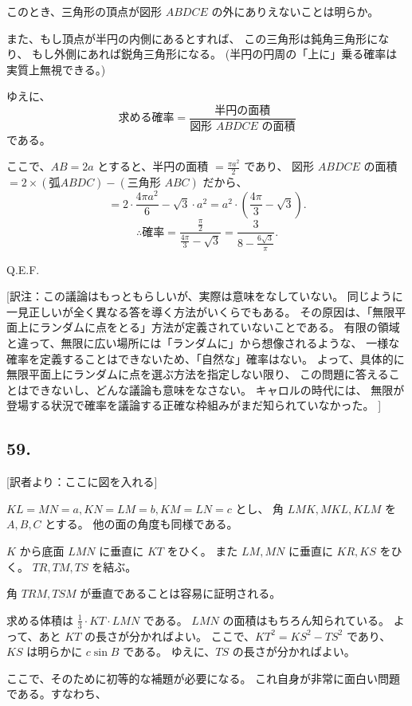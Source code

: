 このとき、三角形の頂点が図形 $ABDCE$ の外にありえないことは明らか。

また、もし頂点が半円の内側にあるとすれば、
この三角形は鈍角三角形になり、
もし外側にあれば鋭角三角形になる。
(半円の円周の「上に」乗る確率は実質上無視できる。)

ゆえに、
\[
\mbox{求める確率} = \frac{\mbox{半円の面積}}{\mbox{図形 $ABDCE$ の面積}}
\]
である。

ここで、$AB = 2a$ とすると、半円の面積 $= \frac{\pi a^2}{2}$ であり、
図形 $ABDCE$ の面積 $= 2 \times (\mbox{弧$ABDC$}) - (\mbox{三角形 $ABC$})$
だから、
\[
= 2 \cdot \frac{4 \pi a^2}{6} - \sqrt{3} \cdot a^2
= a^2 \cdot \left( \frac{4 \pi}{3} - \sqrt{3} \right).
\]
\[
\therefore
\mbox{確率} =
\frac{\frac{\pi}{2}}{\frac{4\pi}{3} - \sqrt{3}}
= \frac{3}{8 - \frac{6 \sqrt{3}}{\pi}}.
\]

Q.E.F.

[訳注：この議論はもっともらしいが、実際は意味をなしていない。
同じように一見正しいが全く異なる答を導く方法がいくらでもある。
その原因は、「無限平面上にランダムに点をとる」方法が定義されていないことである。
有限の領域と違って、無限に広い場所には「ランダムに」から想像されるような、
一様な確率を定義することはできないため、「自然な」確率はない。
よって、具体的に無限平面上にランダムに点を選ぶ方法を指定しない限り、
この問題に答えることはできないし、どんな議論も意味をなさない。
キャロルの時代には、
無限が登場する状況で確率を議論する正確な枠組みがまだ知られていなかった。
]

\subsection*{59.}

[訳者より：ここに図を入れる] 

$KL = MN = a, KN = LM = b, KM = LN = c$ とし、
角 $LMK, MKL, KLM$ を $A, B, C$ とする。
他の面の角度も同様である。

$K$ から底面 $LMN$ に垂直に $KT$ をひく。
また $LM, MN$ に垂直に $KR, KS$ をひく。
$TR, TM, TS$ を結ぶ。

角 $TRM, TSM$ が垂直であることは容易に証明される。

求める体積は $\frac{1}{3} \cdot KT \cdot LMN$ である。
$LMN$ の面積はもちろん知られている。
よって、あと $KT$ の長さが分かればよい。
ここで、$KT^2 = KS^2 - TS^2$ であり、
$KS$ は明らかに $c \sin B$ である。
ゆえに、$TS$ の長さが分かればよい。

ここで、そのために初等的な補題が必要になる。
これ自身が非常に面白い問題である。すなわち、

